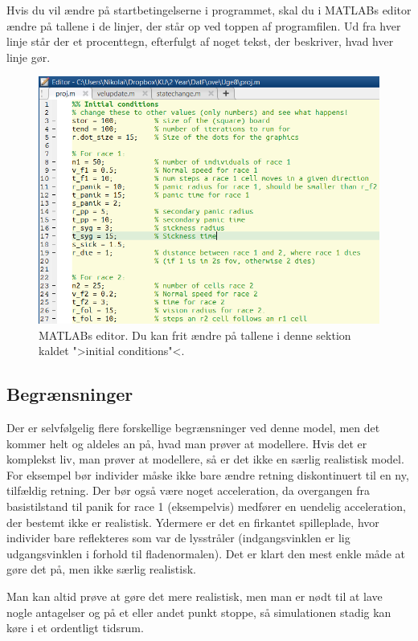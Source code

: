 \documentclass[a4paper,10pt]{article} 	%
\numberwithin{equation}{section}
\begin{document}
	Hvis du vil ændre på startbetingelserne i programmet, skal du i MATLABs editor ændre på tallene i de linjer, der står op ved toppen af programfilen. Ud fra hver linje står der et procenttegn, efterfulgt af noget tekst, der beskriver, hvad hver linje gør.
	
	\begin{figure}[H]
		\centering
		\includegraphics[width=12cm]{img/editor.png}
		\caption{MATLABs editor. Du kan frit ændre på tallene i denne sektion kaldet ">initial conditions"<.}
		\label{fig_editor}
	\end{figure}
	
	\subsection{Begrænsninger}
	Der er selvfølgelig flere forskellige begrænsninger ved denne model, men det kommer helt og aldeles an på, hvad man prøver at modellere. Hvis det er komplekst liv, man prøver at modellere, så er det ikke en særlig realistisk model. For eksempel bør individer måske ikke bare ændre retning diskontinuert til en ny, tilfældig retning. Der bør også være noget acceleration, da overgangen fra basistilstand til panik for race 1 (eksempelvis) medfører en uendelig acceleration, der bestemt ikke er realistisk. Ydermere er det en firkantet spilleplade, hvor individer bare reflekteres som var de lysstråler (indgangsvinklen er lig udgangsvinklen i forhold til fladenormalen). Det er klart den mest enkle måde at gøre det på, men ikke særlig realistisk.
	
	Man kan altid prøve at gøre det mere realistisk, men man er nødt til at lave nogle antagelser og på et eller andet punkt stoppe, så simulationen stadig kan køre i et ordentligt tidsrum.
	
\end{document}
